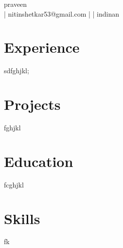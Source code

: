 \documentclass[letterpaper,11pt]{article}
\begin{document}
\begin{center}
    {\Huge praveen} \\
     | \faEnvelope nitinshetkar53@gmail.com | \faGlobe  | \faMapMarker* indinan
\end{center}

\section*{Experience}
sdfghjkl;

\section*{Projects}
fghjkl

\section*{Education}
fcghjkl

\section*{Skills}
fk
\end{document}
